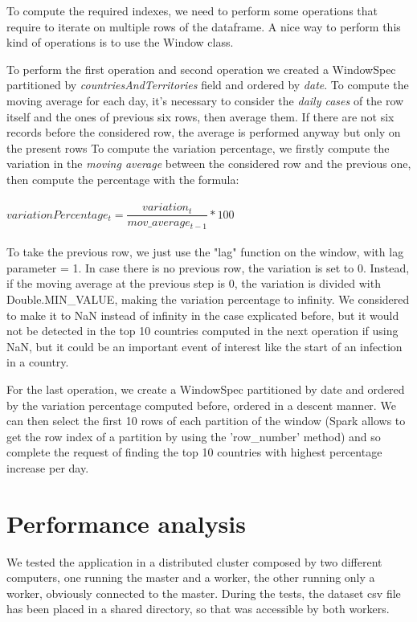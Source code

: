 \documentclass[10pt]{article}
\begin{document}
	To compute the required indexes, we need to perform some operations that require to iterate on multiple rows of the dataframe. A nice way to perform this kind of operations is to use the Window class.
	
	To perform the first operation and second operation we created a WindowSpec partitioned by \textit{countriesAndTerritories} field and ordered by \textit{date}. To compute the moving average for each day, it's necessary to consider the \textit{daily cases} of the row itself and the ones of previous six rows, then average them. If there are not six records before the considered row, the average is performed anyway but only on the present rows
	To compute the variation percentage, we firstly compute the variation in the \textit{moving average} between the considered row and the previous one, then compute the percentage with the formula:\\\\
	$ variationPercentage_{t} = \dfrac{variation_{t}}{mov\_average_{t-1}} * 100$\\\\
	To take the previous row, we just use the "lag" function on the window, with lag parameter = 1. In case there is no previous row, the variation is set to 0. Instead, if the moving average at the previous step is 0, the variation is divided with Double.MIN\_VALUE, making the variation percentage to infinity. We considered to make it to NaN instead of infinity in the case explicated before, but it would not be detected in the top 10 countries computed in the next operation if using NaN, but it could be an important event of interest like the start of an infection in a country.
	
	For the last operation, we create a WindowSpec partitioned by date and ordered by the variation percentage computed before, ordered in a descent manner. We can then select the first 10 rows of each partition of the window (Spark allows to get the row index of a partition by using the 'row\_number' method) and so complete the request of finding the top 10 countries with highest percentage increase per day.
	
	\section{Performance analysis}
    We tested the application in a distributed cluster composed by two different computers, one running the master and a worker, the other running only a worker, obviously connected to the master. During the tests, the dataset csv file has been placed in a shared directory, so that was accessible by both workers.
    
\end{document}
